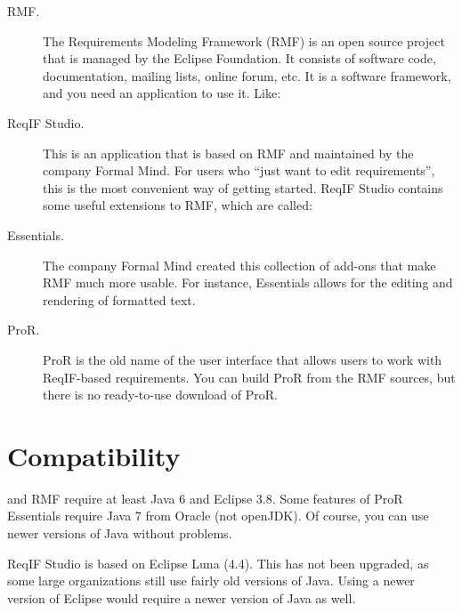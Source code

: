 \begin{description}
\item[RMF.] The Requirements Modeling Framework (RMF) is an open source project that is managed by the Eclipse Foundation.  It consists of software code, documentation, mailing lists, online forum, etc. It is a software framework, and you need an application to use it. Like:
\item[ReqIF Studio.] This is an application that is based on RMF and maintained by the company Formal Mind.  For users who ``just want to edit requirements'', this is the most convenient way of getting started. ReqIF Studio contains some useful extensions to RMF, which are called:
\item[Essentials.] The company Formal Mind created this collection of add-ons that make RMF much more usable.  For instance, Essentials allows for the editing and rendering of formatted text.
\item[ProR.] ProR is the old name of the user interface that allows users to work with ReqIF-based requirements.  You can build ProR from the RMF sources, but there is no ready-to-use download of ProR.
\end{description}

\section{Compatibility}

\pror{} and RMF require at least Java 6 and Eclipse 3.8.  Some features of ProR Essentials require Java 7 from Oracle (not openJDK). Of course, you can use newer versions of Java without problems.

ReqIF Studio is based on Eclipse Luna (4.4). This has not been upgraded, as some large organizations still use fairly old versions of Java. Using a newer version of Eclipse would require a newer version of Java as well.

